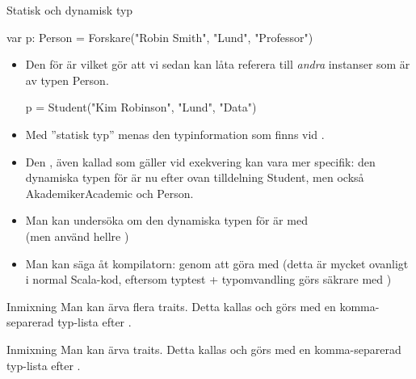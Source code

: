 \begin{Slide}{Statisk och dynamisk typ}\SlideFontSmall
\begin{Code}
    var p: Person = Forskare("Robin Smith", "Lund", "Professor")
\end{Code}
\begin{itemize}\SlideFontTiny
\item Den  för  är  vilket gör att vi sedan kan låta  referera till \emph{andra} instanser som är av typen Person.
\begin{Code}
p = Student("Kim Robinson", "Lund", "Data")
\end{Code}

\pause

\item Med ''statisk typ'' menas den typinformation som finns vid .

\pause
\item Den , även kallad  som gäller vid exekvering kan vara mer specifik: den dynamiska typen för  är nu efter ovan tilldelning Student, men också \ifswedish Akademiker\else Academic\fi{} och Person.

\pause

\item  Man kan undersöka om den dynamiska typen för  är  med \\  (men använd hellre )

\pause

\item  Man kan säga åt kompilatorn:  genom att göra   med    
   (detta är mycket ovanligt i normal Scala-kod, eftersom typtest + typomvandling görs säkrare med )
\end{itemize}
\end{Slide}



\ifkompendium
\begin{Slide}{Inmixning}\SlideFontTiny
Man kan ärva flera traits. Detta kallas   och görs med en komma-separerad typ-lista efter .
\end{Slide}
\else
\begin{Slide}{Inmixning}\SlideFontTiny
Man kan ärva  traits. Detta kallas   och görs med en komma-separerad typ-lista efter .
\end{Slide}
\fi



